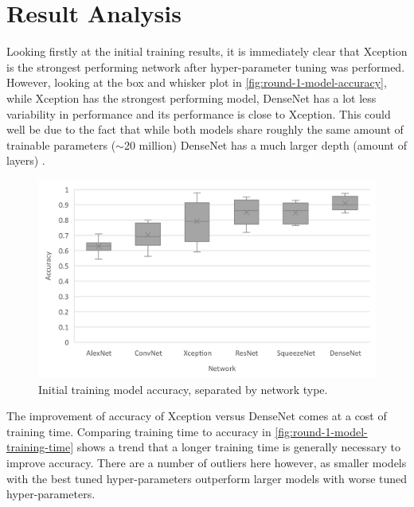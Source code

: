 \section{Result Analysis}
Looking firstly at the initial training results, it is immediately clear that Xception is the strongest performing network after hyper-parameter tuning was performed. However, looking at the box and whisker plot in \autoref{fig:round-1-model-accuracy}, while Xception has the strongest performing model, DenseNet has a lot less variability in performance and its performance is close to Xception. This could well be due to the fact that while both models share roughly the same amount of trainable parameters ($\sim$20 million) DenseNet has a much larger depth (amount of layers) \citep{KerasApp92:online}.

\begin{figure}[H]
    \centering
    \includegraphics[width=\textwidth]{figures/round-1-model-accuracy.png}
    \caption{Initial training model accuracy, separated by network type.}
    \label{fig:round-1-model-accuracy}
\end{figure}

The improvement of accuracy of Xception versus DenseNet comes at a cost of training time. Comparing training time to accuracy in \autoref{fig:round-1-model-training-time} shows a trend that a longer training time is generally necessary to improve accuracy. There are a number of outliers here however, as smaller models with the best tuned hyper-parameters outperform larger models with worse tuned hyper-parameters.


